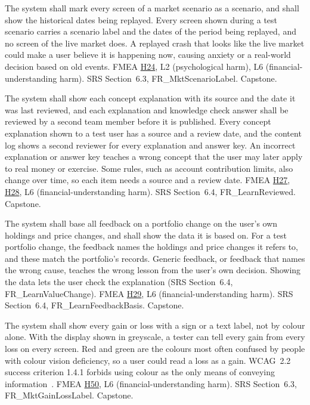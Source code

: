 \documentclass{article}
\newcommand{\hazref}[1]{\hyperref[#1]{#1}}
\begin{document}
\begin{description}
{The system shall mark every screen of a market scenario as a scenario, and
shall show the historical dates being replayed.}
{Every screen shown during a test scenario carries a scenario label and the
dates of the period being replayed, and no screen of the live market does.}
{A replayed crash that looks like the live market could make a user believe it
is happening now, causing anxiety or a real-world decision based on old
events.}
{FMEA \hazref{H24}, L2 (psychological harm), L6 (financial-understanding harm).}
{SRS Section~6.3, FR\_MktScenarioLabel.}
{Capstone.}

{The system shall show each concept explanation with its source and the date
it was last reviewed, and each explanation and knowledge check answer shall be
reviewed by a second team member before it is published.}
{Every concept explanation shown to a test user has a source and a review date,
and the content log shows a second reviewer for every explanation and answer
key.}
{An incorrect explanation or answer key teaches a wrong concept that the user
may later apply to real money or exercise. Some rules, such as account
contribution limits, also change over time, so each item needs a source and a
review date.}
{FMEA \hazref{H27}, \hazref{H28}, L6 (financial-understanding harm).}
{SRS Section~6.4, FR\_LearnReviewed.}
{Capstone.}

{The system shall base all feedback on a portfolio change on the user's own
holdings and price changes, and shall show the data it is based on.}
{For a test portfolio change, the feedback names the holdings and price
changes it refers to, and these match the portfolio's records.}
{Generic feedback, or feedback that names the wrong cause, teaches the wrong
lesson from the user's own decision. Showing the data lets the user check the
explanation (SRS Section~6.4, FR\_LearnValueChange).}
{FMEA \hazref{H29}, L6 (financial-understanding harm).}
{SRS Section~6.4, FR\_LearnFeedbackBasis.}
{Capstone.}

{The system shall show every gain or loss with a sign or a text label, not by
colour alone.}
{With the display shown in greyscale, a tester can tell every gain from every
loss on every screen.}
{Red and green are the colours most often confused by people with colour
vision deficiency, so a user could read a loss as a gain. WCAG~2.2 success
criterion 1.4.1 forbids using colour as the only means of conveying
information~\cite{WCAG22}.}
{FMEA \hazref{H50}, L6 (financial-understanding harm).}
{SRS Section~6.3, FR\_MktGainLossLabel.}
{Capstone.}

\end{description}
\end{document}
